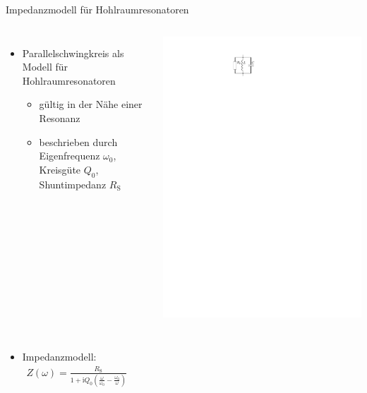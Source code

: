 \documentclass[12pt,xcolor=dvipsnames,professionalfonts]{beamer}
\begin{document}
\begin{frame}{Impedanzmodell für Hohlraumresonatoren}
	\begin{columns}[c]
		\begin{itemize}
			\item Parallelschwingkreis als Modell für Hohlraumresonatoren
			\begin{itemize}
				\setlength\itemsep{0.25em}
				\item gültig in der Nähe einer Resonanz
				
				\item beschrieben durch Eigenfrequenz $\omega_0$, Kreisgüte $Q_0$, Shuntimpedanz $R_\mathrm{S}$
			\end{itemize}
		\end{itemize}
		
		\centering
		\includegraphics[scale=1.15]{./figures/RLC_circuit.pdf}
	\end{columns}
	\vfill
	\begin{columns}[T]
		\begin{itemize}
			\item Impedanzmodell:
			\begin{align*}
			Z(\omega) = \frac{R_\mathrm{S}}{1 + \mathrm{i} Q_0 \left( \frac{\omega}{\omega_0} - \frac{\omega_0}{\omega} \right)}
			\end{align*}
		\end{itemize}
		

\end{columns}
\end{frame}
\end{document}
